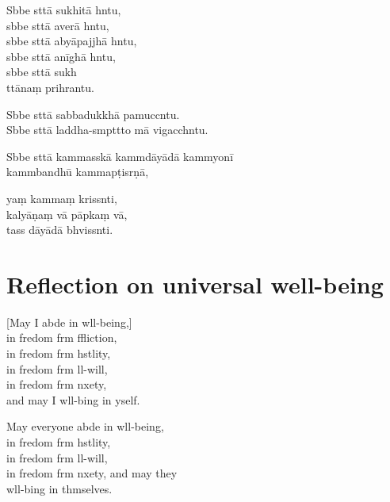 Sbbe sttā sukhitā hntu,\\
sbbe sttā averā hntu,\\
sbbe sttā abyāpajjhā hntu,\\
sbbe sttā anīghā hntu,\\
sbbe sttā sukh\\
ttānaṃ prihrantu.

Sbbe sttā sabbadukkhā pamuccntu.\\
Sbbe sttā laddha-smpttto mā vigacchntu.

Sbbe sttā kammasskā kammdāyādā kammyonī\\
\vin kammbandhū kammapṭisrṇā,

yaṃ kammaṃ krissnti,\\
kalyāṇaṃ vā pāpkaṃ vā,\\
tass dāyādā bhvissnti.

\clearpage

\chapter[Universal well-being]{Reflection on universal well-being}                                     %

\begin{leader}
\end{leader}

[May I abde in wll-being,]\\
in fredom frm ffliction,\\
in fredom frm hstlity,\\
in fredom frm ll-will,\\
in fredom frm nxety,\\
and may I  wll-bing in yself.

May everyone abde in wll-being,\\
in fredom frm hstlity,\\
in fredom frm ll-will,\\
in fredom frm nxety, and may they\\
 wll-bing in thmselves.

